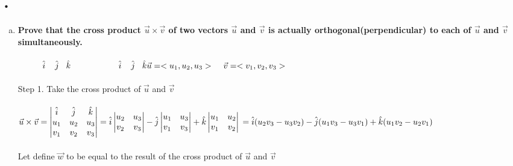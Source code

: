 \documentclass{article}
\begin{document}
\section{.}
\begin{enumerate}[a.]
\item \textbf{Prove that the cross product $\vec{u} \times \vec{v}$ of two vectors $\vec{u}$ and $\vec{v}$ is actually orthogonal(perpendicular) to each of $\vec{u}$ and $\vec{v}$ simultaneously.}\\
\\

$\hspace{1cm}\hat{i}\hspace{.4cm}\hat{j}\hspace{.3cm}\hat{k}\hspace{2cm}\hat{i}\hspace{.4cm}\hat{j}\hspace{.3cm}\hat{k}\\\vec{u} = <u_{1},u_{2},u_{3}>\hspace{.4cm}\vec{v} = <v_{1},v_{2},v_{3}>$\\
\\
Step 1. Take the cross product of $\vec{u}$ and $\vec{v}$\\
\\
$\vec{u}\times\vec{v}=\begin{vmatrix}
\hat{i}&\hat{j}&\hat{k}\\
u_{1}&u_{2}&u_{3}\\
v_{1}&v_{2}&v_{3}\\
\end{vmatrix}=\hat{i}
\begin{vmatrix}
u_{2}&u_{3}\\
v_{2}&v_{3}\\
\end{vmatrix}-\hat{j}\begin{vmatrix}
u_{1}&u_{3}\\
v_{1}&v_{3}\\
\end{vmatrix}+\hat{k}\begin{vmatrix}
u_{1}&u_{2}\\
v_{1}&v_{2}\\
\end{vmatrix}\\
=\hat{i}(u_{2}v_{3}-u_{3}v_{2})-\hat{j}(u_{1}v_{3}-u_{3}v_{1})+\hat{k}(u_{1}v_{2}-u_{2}v_{1})$\\
\\
Let define $\vec{w}$ to be equal to the result of the cross product of $\vec{u}$ and $\vec{v}$\\

\end{enumerate}
\end{document}
